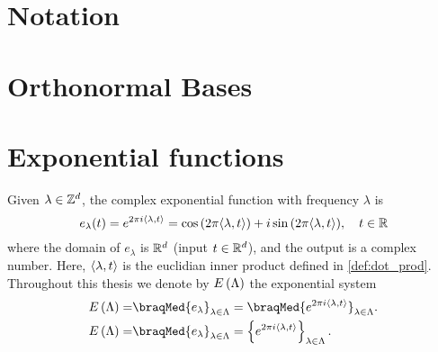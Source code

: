 \documentclass[../thesis.tex]{subfiles}
\begin{document}
\section{Notation}
    

\section{Orthonormal Bases}
    


\section{Exponential functions}
Given $\lambda \in \mathbb{Z}^d$, the complex exponential function with frequency $\lambda$ is 
\begin{equation}
    e_{\lambda}(t) = e^{2 \pi i \langle \lambda, t \rangle} = \cos{(2 \pi \langle \lambda, t \rangle)} + i \sin{(2 \pi \langle \lambda, t \rangle)}, \quad t\in \mathbb{R}    
\end{equation}
where the domain of $e_\lambda$ is $\mathbb{R}^d$ (input $t \in \mathbb{R}^d$), and the output is a complex number. Here, $\langle \lambda, t \rangle$ is the euclidian inner product defined in \cref{def:dot_prod}. Throughout this thesis we denote by $E\left(\Lambda\right)$ the exponential system
\begin{align}
    E\brac{\Lambda} =& \braqMed{e_\lambda}_{\lambda \in \Lambda} = \braqMed{e^{2\pi i \inpl{t}}}_{\lambda \in \Lambda}.\\
    E\brac{\Lambda} =& \braqMed{e_\lambda}_{\lambda \in \Lambda} = \braq{e^{2\pi i \inpl{t}}}_{\lambda \in \Lambda}.
\end{align}
\end{document}

